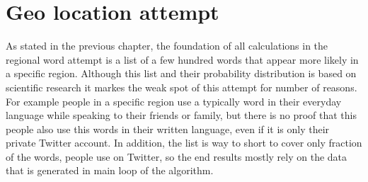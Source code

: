 \documentclass[../Main.tex]{subfiles}
\begin{document}
\section{Geo location attempt }
As stated in the previous chapter, the foundation of all calculations in the regional word attempt is a list of a few hundred words that appear more likely in a specific region. 
Although this list and their probability distribution is based on scientific research it markes the weak spot of this attempt for number of reasons. For example people in a specific region use a typically word in their everyday language while speaking to their friends or family, but there is no proof that this people also use this words in their written language, even if it is only their private Twitter account. In addition, the list is way to short to cover only fraction of the words, people use on Twitter, so the end results mostly rely on the data that is generated in main loop of the algorithm.
\end{document}
